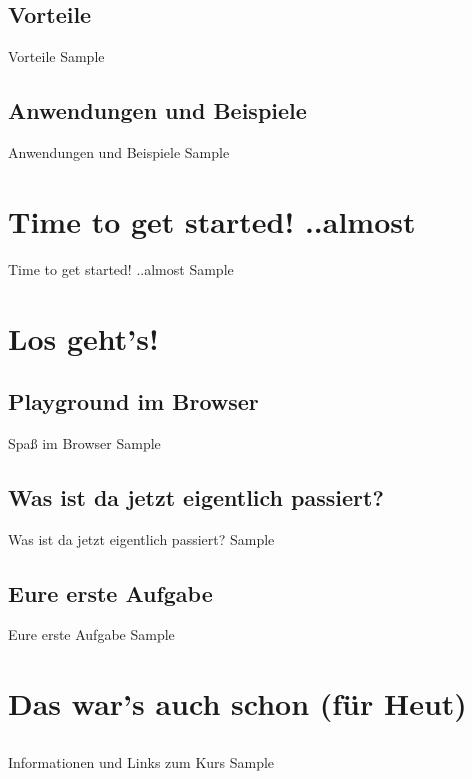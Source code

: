 \subsection{Vorteile}
\begin{frame}{Vorteile}
	Sample
\end{frame}


\subsection{Anwendungen und Beispiele}
\begin{frame}{Anwendungen und Beispiele}
	Sample
\end{frame}



\section{Time to get started! ..almost}

\begin{frame}{Time to get started! ..almost}
	Sample
\end{frame}




\section{Los geht's!}


\subsection{Playground im Browser}
\begin{frame}{Spaß im Browser}
	Sample
\end{frame}


\subsection{Was ist da jetzt eigentlich passiert?}
\begin{frame}{Was ist da jetzt eigentlich passiert?}
	Sample
\end{frame}


\subsection{Eure erste Aufgabe}
\begin{frame}{Eure erste Aufgabe}
	Sample
\end{frame}



\section{Das war's auch schon (für Heut)}


\subsection{}
\begin{frame}{Informationen und Links zum Kurs}
	Sample
\end{frame}


